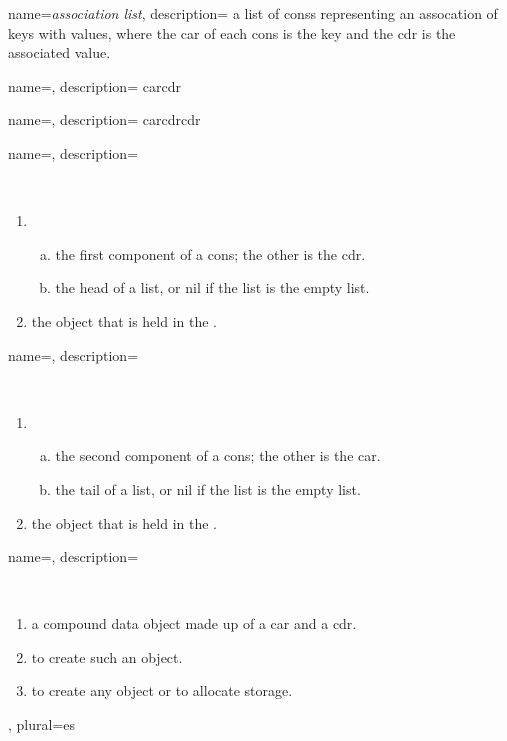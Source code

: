 {
  name={\sl association list},
  description={%
    a list of \glspl{cons} representing an assocation of keys with values,
    where the \gls{car} of each \gls{cons} is the key and the \gls{cdr} is the
    associated value.
  }
}


{
  name={},
  description={%
    \gls{car}\lsp{ (}\gls{cdr}
  }
}

{
  name={},
  description={%
    \gls{car}\lsp{ (}\gls{cdr}\lsp{ (}\gls{cdr}
  }
}


{
  name={},
  description={\ \\
    \begin{enumerate}
    \item \ \\
      \begin{enumerate}[a.]
      \item the first component of a \gls{cons}; the other is the \gls{cdr}.
      \item the head of a list, or \gls{nil} if the list is the \gls{empty
          list}.
      \end{enumerate}
    \item the \gls{object} that is held in the . 
    \end{enumerate}
  }
}

{
  name={},
  description={\ \\
    \begin{enumerate}
    \item \ \\
      \begin{enumerate}[a.]
      \item the second component of a \gls{cons}; the other is the \gls{car}.
      \item the tail of a list, or \gls{nil} if the list is the \gls{empty
          list}.
      \end{enumerate}
    \item the \gls{object} that is held in the . 
    \end{enumerate}
  }
}


{
  name={},
  description={\ \\
    \begin{enumerate}
    \item a compound data \gls{object} made up of a \gls{car} and a \gls{cdr}.
    \item to create such an \gls{object}.
    \item to create any \gls{object} or to allocate storage.
    \end{enumerate}
  },
  plural={es}
}



